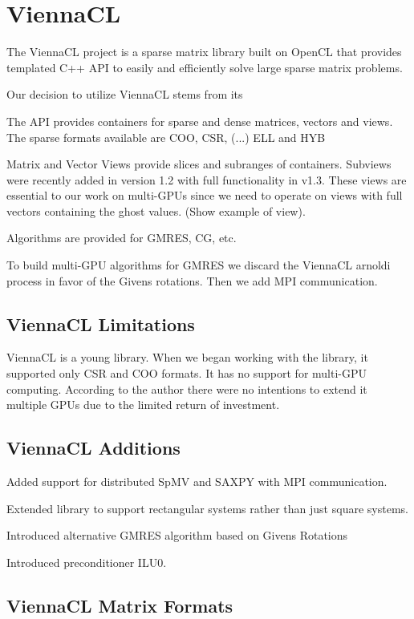 \documentclass{report}
\begin{document}
\fi


\chapter{ViennaCL}


The ViennaCL project \cite{Rupp2010a, Rupp2010} is a sparse matrix library built on OpenCL that provides templated C++ API to easily and efficiently solve large sparse matrix problems. 

Our decision to utilize ViennaCL stems from its 

The API provides containers for sparse and dense matrices, vectors and views. The sparse formats available are COO, CSR, (...) ELL and HYB

Matrix and Vector Views provide slices and subranges of containers. Subviews were recently added in version 1.2 with full functionality in v1.3. These views are essential to our work on multi-GPUs since we need to operate on views with full vectors containing the ghost values. (Show example of view). 

Algorithms are provided for GMRES, CG, etc. 

To build multi-GPU algorithms for GMRES we discard the ViennaCL arnoldi process in favor of the Givens rotations. Then we add MPI communication. 



\section{ViennaCL Limitations}
ViennaCL is a young library. When we began working with the library, it supported only CSR and COO formats. It has no support for multi-GPU computing. According to the author there were no intentions to extend it multiple GPUs due to the limited return of investment. 

\section{ViennaCL Additions}
Added support for distributed SpMV and SAXPY with MPI communication. 

Extended library to support rectangular systems rather than just square systems. 

Introduced alternative GMRES algorithm based on Givens Rotations

Introduced preconditioner ILU0. 

\section{ViennaCL Matrix Formats}
\end{document}
